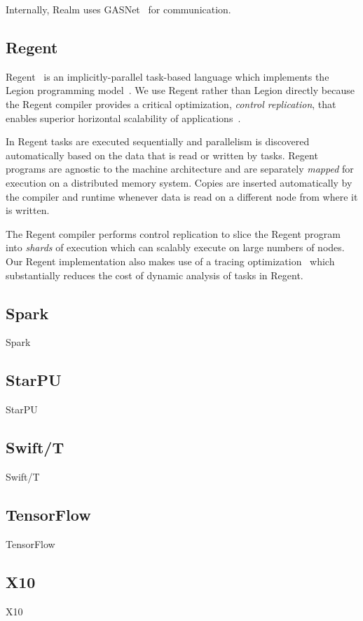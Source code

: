 Internally, Realm uses GASNet~\cite{GASNET07} for communication.

\subsection{Regent}

Regent~\cite{Regent15} is an implicitly-parallel task-based language
which implements the Legion programming model~\cite{Legion12}. We use
Regent rather than Legion directly because the Regent compiler
provides a critical optimization, \emph{control replication}, that
enables superior horizontal scalability of
applications~\cite{ControlReplication17}.

In Regent tasks are executed sequentially and parallelism is
discovered automatically based on the data that is read or written by
tasks. Regent programs are agnostic to the machine architecture and
are separately \emph{mapped} for execution on a distributed memory
system. Copies are inserted automatically by the compiler and runtime
whenever data is read on a different node from where it is written.

The Regent compiler performs control replication to slice the Regent
program into \emph{shards} of execution which can scalably execute on
large numbers of nodes. Our Regent implementation also makes use of a
tracing optimization~\cite{LegionTracing18} which substantially
reduces the cost of dynamic analysis of tasks in Regent.

\subsection{Spark}

Spark~\cite{Spark10}

\subsection{StarPU}

StarPU~\cite{StarPU11}

\subsection{Swift/T}

Swift/T~\cite{Wozniak13}

\subsection{TensorFlow}

TensorFlow~\cite{TensorFlow15}

\subsection{X10}

X10~\cite{X1005}
